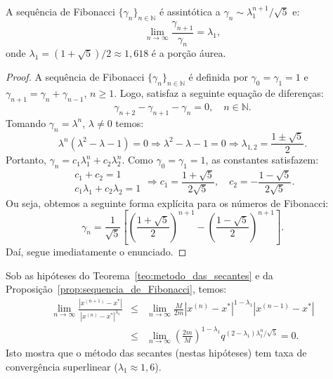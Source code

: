 \begin{prop}\label{prop:sequencia_de_Fibonacci}
  A sequência de Fibonacci $\{\gamma_n\}_{n\in\mathbb{N}}$ é assintótica a $\gamma_n \sim \lambda_1^{n+1}/\sqrt{5}$ e:
\begin{equation}
  \lim_{n\to\infty} \frac{\gamma_{n+1}}{\gamma_{n}} = \lambda_1,
\end{equation}
onde $\lambda_1 = (1+\sqrt{5})/2\approx 1,618$ é a porção áurea.
\end{prop}
\begin{proof}
  A sequência de Fibonacci $\{\gamma_n\}_{n\in\mathbb{N}}$ é definida por $\gamma_0 = \gamma_1 = 1$ e $\gamma_{n+1} = \gamma_n + \gamma_{n-1}$, $n\geq 1$. Logo, satisfaz a seguinte equação de diferenças:
  \begin{equation}
    \gamma_{n+2} - \gamma_{n+1} - \gamma_{n} = 0,\quad n\in\mathbb{N}.
  \end{equation}
Tomando $\gamma_n = \lambda^n$, $\lambda\neq 0$ temos:
\begin{equation}
  \lambda^n\left(\lambda^2 - \lambda - 1\right) = 0 \Rightarrow   \lambda^2 - \lambda - 1 = 0 \Rightarrow \lambda_{1,2} = \frac{1 \pm \sqrt{5}}{2}.
\end{equation}
Portanto, $\gamma_n = c_1\lambda_1^n + c_2\lambda_2^n$. Como $\gamma_0 = \gamma_1 = 1$, as constantes satisfazem:
\begin{equation}
  \begin{array}{l}
    c_1 + c_2 = 1\\
    c_1\lambda_1 + c_2\lambda_2 = 1
  \end{array}
    \Rightarrow
    c_1 = \frac{1+\sqrt{5}}{2\sqrt{5}},\quad c_2 = -\frac{1-\sqrt{5}}{2\sqrt{5}}.
\end{equation}
Ou seja, obtemos a seguinte forma explícita para os números de Fibonacci:
\begin{equation}
  \gamma_n = \frac{1}{\sqrt{5}}\left[\left(\frac{1+\sqrt{5}}{2}\right)^{n+1} - \left(\frac{1-\sqrt{5}}{2}\right)^{n+1}\right].
\end{equation}
Daí, segue imediatamente o enunciado.
\end{proof}

\begin{obs}
  Sob as hipóteses do Teorema~\ref{teo:metodo_das_secantes} e da Proposição~\ref{prop:sequencia_de_Fibonacci}, temos:
  \begin{eqnarray}
    \lim_{n\to\infty} \frac{|x^{(n+1)}-x^*|}{|x^{(n)} - x^*|^{\lambda_1}} &\leq& \lim_{n\to\infty} \frac{M}{2m}|x^{(n)}-x^*|^{1-\lambda_1}|x^{(n-1)}-x^*| \\
    &\leq& \lim_{n\to\infty} \left(\frac{2m}{M}\right)^{1-\lambda_1}q^{(2-\lambda_1)\lambda_1^{n}/\sqrt{5}} = 0.
  \end{eqnarray}
Isto mostra que o método das secantes (nestas hipóteses) tem taxa de convergência superlinear ($\lambda_1 \approx 1,6$).
\end{obs}


